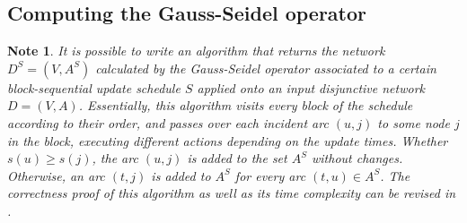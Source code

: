 \documentclass[preprint,12pt]{elsarticle}
\newtheorem{note}{Note}
\begin{document}
\subsection{Computing the Gauss-Seidel operator}\label{subsec-comp-gs}
\begin{note}\label{pseudocode}
It is possible to write an algorithm that returns the network $D^S=(V,A^S)$ calculated by the Gauss-Seidel operator associated to a certain block-sequential update schedule $S$ applied onto an input disjunctive network $D=(V,A)$. Essentially, this algorithm visits every block of the schedule according to their order, and passes over each incident arc $(u,j)$ to some node $j$ in the block, executing different actions depending on the update times. Whether $s(u)\geq s(j)$, the arc $(u,j)$ is added to the set $A^S$ without changes. Otherwise, an arc $(t,j)$ is added to $A^S$ for every arc $(t,u) \in A^S$. The correctness proof of this algorithm as well as its time complexity can be revised in \cite{mitesis}.
\end{note}

\end{document}
